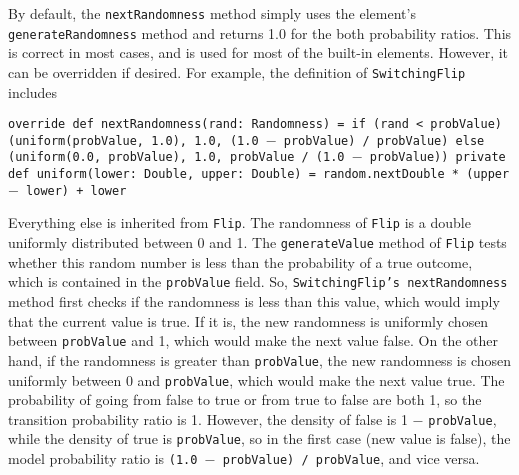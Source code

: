 By default, the \texttt{nextRandomness} method simply uses the element's \texttt{generateRandomness} method and returns 1.0 for the both probability ratios. This is correct in most cases, and is used for most of the built-in elements. However, it can be overridden if desired. For example, the definition of \texttt{SwitchingFlip} includes

\begin{flushleft}
\texttt{override def nextRandomness(rand: Randomness) =
\newline \tab if (rand < probValue)
\newline \tab (uniform(probValue, 1.0), 1.0, (1.0 $-$ probValue) / probValue)
\newline \tab else (uniform(0.0, probValue), 1.0, probValue / (1.0 $-$ probValue))
\newline 
\newline private def uniform(lower: Double, upper: Double) =
\newline \tab random.nextDouble * (upper $-$ lower) + lower
}
\end{flushleft}

Everything else is inherited from \texttt{Flip}. The randomness of \texttt{Flip} is a double uniformly distributed between 0 and 1. The \texttt{generateValue} method of \texttt{Flip} tests whether this random number is less than the probability of a true outcome, which is contained in the \texttt{probValue} field. So, \texttt{SwitchingFlip's nextRandomness} method first checks if the randomness is less than this value, which would imply that the current value is true. If it is, the new randomness is uniformly chosen between \texttt{probValue} and
1, which would make the next value false. On the other hand, if the randomness is greater than \texttt{probValue}, the new randomness is chosen uniformly between 0 and \texttt{probValue}, which would make the next value true. The probability of going from false to true or from true to false are both 1, so the transition probability ratio is 1. However, the density of false is 1 $-$ \texttt{probValue}, while the density of true is \texttt{probValue}, so in the first case (new value is false), the model probability ratio is \texttt{(1.0 $-$ probValue) / probValue}, and vice versa.
